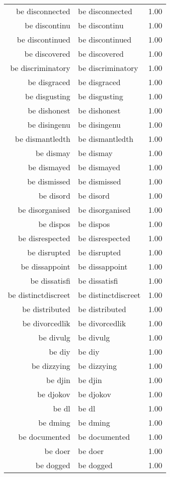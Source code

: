 \begin{table}[ht]
\begin{tabular}{rlr}
  be disconnected & be disconnected & 1.00 \\ 
  be discontinu & be discontinu & 1.00 \\ 
  be discontinued & be discontinued & 1.00 \\ 
  be discovered & be discovered & 1.00 \\ 
  be discriminatory & be discriminatory & 1.00 \\ 
  be disgraced & be disgraced & 1.00 \\ 
  be disgusting & be disgusting & 1.00 \\ 
  be dishonest & be dishonest & 1.00 \\ 
  be disingenu & be disingenu & 1.00 \\ 
  be dismantledth & be dismantledth & 1.00 \\ 
  be dismay & be dismay & 1.00 \\ 
  be dismayed & be dismayed & 1.00 \\ 
  be dismissed & be dismissed & 1.00 \\ 
  be disord & be disord & 1.00 \\ 
  be disorganised & be disorganised & 1.00 \\ 
  be dispos & be dispos & 1.00 \\ 
  be disrespected & be disrespected & 1.00 \\ 
  be disrupted & be disrupted & 1.00 \\ 
  be dissappoint & be dissappoint & 1.00 \\ 
  be dissatisfi & be dissatisfi & 1.00 \\ 
  be distinctdiscreet & be distinctdiscreet & 1.00 \\ 
  be distributed & be distributed & 1.00 \\ 
  be divorcedlik & be divorcedlik & 1.00 \\ 
  be divulg & be divulg & 1.00 \\ 
  be diy & be diy & 1.00 \\ 
  be dizzying & be dizzying & 1.00 \\ 
  be djin & be djin & 1.00 \\ 
  be djokov & be djokov & 1.00 \\ 
  be dl & be dl & 1.00 \\ 
  be dming & be dming & 1.00 \\ 
  be documented & be documented & 1.00 \\ 
  be doer & be doer & 1.00 \\ 
  be dogged & be dogged & 1.00 \\ 

\end{tabular}
\end{table}
